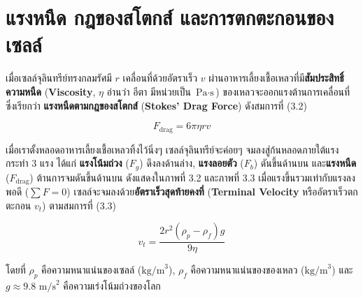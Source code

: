 \section{แรงหนืด กฎของสโตกส์ และการตกตะกอนของเซลล์}


เมื่อเซลล์จุลินทรีย์ทรงกลมรัศมี $r$ เคลื่อนที่ด้วยอัตราเร็ว $v$ ผ่านอาหารเลี้ยงเชื้อเหลวที่มี\textbf{สัมประสิทธิ์ความหนืด} (\textbf{Viscosity}, $\eta$ อ่านว่า อีตา มีหน่วยเป็น $\text{Pa}\cdot\text{s}$) ของเหลวจะออกแรงต้านการเคลื่อนที่ซึ่งเรียกว่า \textbf{แรงหนืดตามกฎของสโตกส์} (\textbf{Stokes' Drag Force}) ดังสมการที่ (3.2)

\begin{equation}
    F_{\text{drag}} = 6 \pi \eta r v
\end{equation}

เมื่อเราตั้งหลอดอาหารเลี้ยงเชื้อเหลวทิ้งไว้นิ่งๆ เซลล์จุลินทรีย์จะค่อยๆ จมลงสู่ก้นหลอดภายใต้แรงกระทำ 3 แรง ได้แก่ \textbf{แรงโน้มถ่วง} ($F_g$) ดึงลงด้านล่าง, \textbf{แรงลอยตัว} ($F_b$) ดันขึ้นด้านบน และ\textbf{แรงหนืด} ($F_{\text{drag}}$) ต้านการจมดันขึ้นด้านบน ดังแสดงใน\mbox{ภาพที่} 3.2 และ\mbox{ภาพที่} 3.3 เมื่อแรงขึ้นรวมเท่ากับแรงลงพอดี ($\sum F = 0$) เซลล์จะจมลงด้วย\textbf{อัตราเร็วสุดท้ายคงที่} (\textbf{Terminal Velocity} หรืออัตราเร็วตกตะกอน $v_t$) ตามสมการที่ (3.3)

\begin{equation}
    v_t = \frac{2 r^2 (\rho_p - \rho_f) g}{9 \eta}
\end{equation}

โดยที่ $\rho_p$ คือความหนาแน่นของเซลล์ ($\text{kg/m}^3$), $\rho_f$ คือความหนาแน่นของของเหลว ($\text{kg/m}^3$) และ $g \approx 9.8\text{ m/s}^2$ คือความเร่งโน้มถ่วงของโลก

